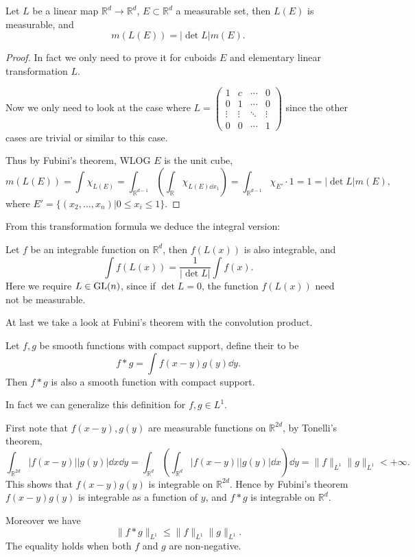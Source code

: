 \begin{proposition}
	Let $L$ be a linear map $\mathbb{R}^{d}\to \mathbb{R}^{d}$,
	$E \subset \mathbb{R}^{d}$ a measurable set, then  $L(E)$ is measurable, and
	\[
	m(L(E)) = |\det L|m(E).
	\]
\end{proposition}
\begin{proof}[Proof]
    In fact we only need to prove it for cuboids $E$ and
	elementary linear transformation $L$.

	Now we only need to look at the case where
	$L = \begin{pmatrix}
		1 &c &\cdots &0\\
		0 &1 &\cdots &0\\
		\vdots &\vdots &\ddots &\vdots\\
		0 &0 &\cdots &1
	\end{pmatrix}$ since the other cases are trivial or similar to this case.

	Thus by Fubini's theorem, WLOG $E$ is the unit cube,
	\[
	m(L(E)) = \int \chi_{L(E)} = \int_{\mathbb{R}^{d-1}}
	\left( \int_{\mathbb{R}} \chi_{L(E)\dd x_1} \right)
	= \int_{\mathbb{R}^{d-1}} \chi_{E'}\cdot 1 = 1 = |\det L|m(E),
	\]
	where $E' = \{(x_2,\dots,x_n)| 0\le x_i\le 1\}$.
\end{proof}

From this transformation formula we deduce the integral version:

Let $f$ be an integrable function on  $\mathbb{R}^{d}$, then
$f(L(x))$ is also integrable, and
\[
\int f(L(x)) = \frac{1}{|\det L|}\int f(x).
\]
Here we require $L\in \mathrm{GL}(n)$, since if  $\det L = 0$, the function
 $f(L(x))$ need not be measurable.

At last we take a look at Fubini's theorem with the convolution product.
\begin{definition}[Convolution]
	Let $f, g$ be smooth functions with compact support, define
	their  to be
	\[
	f*g = \int f(x-y)g(y)\dd y.
	\]
	Then $f*g$ is also a smooth function with compact support.
\end{definition}

In fact we can generalize this definition for $f,g\in L^1$.

First note that $f(x-y),g(y)$ are measurable functions on $\mathbb{R}^{2d}$,
by Tonelli's theorem,
\[
\int_{\mathbb{R}^{2d}} |f(x-y)||g(y)|\dd x\dd y
=\int _{\mathbb{R}^{d}}\left( \int_{\mathbb{R}^{d}}|f(x-y)||g(y)|\dd x \right)\dd y
=\lVert f \rVert _{L^1} \lVert g \rVert _{L^1} < +\infty.
\]
This shows that $f(x-y)g(y)$ is integrable on $\mathbb{R}^{2d}$.
Hence by Fubini's theorem $f(x-y)g(y)$ is integrable as a function of $y$,
and $f*g$ is integrable on $\mathbb{R}^{d}$.

Moreover we have
\[
\lVert f*g \rVert _{L^1} \le \lVert f \rVert _{L^1} \lVert g \rVert _{L^1}.
\]
The equality holds when both $f$ and $g$ are non-negative.
